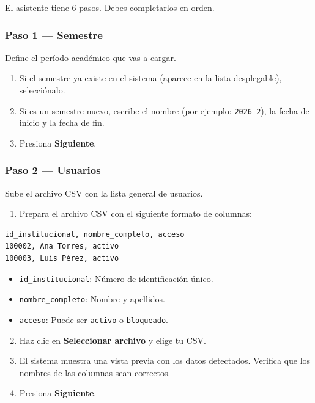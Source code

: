 \documentclass[12pt, a4paper]{article}
\begin{document}
El asistente tiene 6 pasos. Debes completarlos en orden.

\subsubsection{Paso 1 — Semestre}

Define el período académico que vas a cargar.

\begin{enumerate}
  \item Si el semestre ya existe en el sistema (aparece en la lista
        desplegable), selecciónalo.
  \item Si es un semestre nuevo, escribe el nombre (por ejemplo:
        \texttt{2026-2}), la fecha de inicio y la fecha de fin.
  \item Presiona \textbf{Siguiente}.
\end{enumerate}

\subsubsection{Paso 2 — Usuarios}

Sube el archivo CSV con la lista general de usuarios.

\begin{enumerate}
  \item Prepara el archivo CSV con el siguiente formato de columnas:
\end{enumerate}

\begin{lstlisting}
id_institucional, nombre_completo, acceso
100002, Ana Torres, activo
100003, Luis Pérez, activo
\end{lstlisting}

\begin{itemize}
  \item \texttt{id\_institucional}: Número de identificación único.
  \item \texttt{nombre\_completo}: Nombre y apellidos.
  \item \texttt{acceso}: Puede ser \texttt{activo} o \texttt{bloqueado}.
\end{itemize}

\begin{enumerate}
  \setcounter{enumi}{1}
  \item Haz clic en \textbf{Seleccionar archivo} y elige tu CSV.
  \item El sistema muestra una vista previa con los datos detectados.
        Verifica que los nombres de las columnas sean correctos.
  \item Presiona \textbf{Siguiente}.
\end{enumerate}
\end{document}
